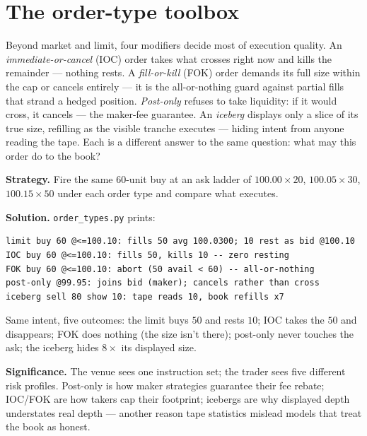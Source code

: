 \section{The order-type toolbox}\label{sec:ordertypes}
Beyond market and limit, four modifiers decide most of execution
quality. An \emph{immediate-or-cancel} (IOC) order takes what
crosses right now and kills the remainder --- nothing rests. A
\emph{fill-or-kill} (FOK) order demands its full size within the
cap or cancels entirely --- it is the all-or-nothing guard against
partial fills that strand a hedged position. \emph{Post-only}
refuses to take liquidity: if it would cross, it cancels ---
the maker-fee guarantee. An \emph{iceberg} displays only a slice
of its true size, refilling as the visible tranche executes ---
hiding intent from anyone reading the tape. Each is a different
answer to the same question: what may this order do to the book?

\begin{example}\label{ex:ordertypes}
\textbf{Strategy.} Fire the same 60-unit buy at an ask ladder of
$100.00\times20$, $100.05\times30$, $100.15\times50$ under each
order type and compare what executes.

\textbf{Solution.} \texttt{order\_types.py} prints:
\begin{verbatim}
limit buy 60 @<=100.10: fills 50 avg 100.0300; 10 rest as bid @100.10
IOC buy 60 @<=100.10: fills 50, kills 10 -- zero resting
FOK buy 60 @<=100.10: abort (50 avail < 60) -- all-or-nothing
post-only @99.95: joins bid (maker); cancels rather than cross
iceberg sell 80 show 10: tape reads 10, book refills x7
\end{verbatim}
Same intent, five outcomes: the limit buys $50$ and rests $10$;
IOC takes the $50$ and disappears; FOK does nothing (the size
isn't there); post-only never touches the ask; the iceberg hides
$8\times$ its displayed size.

\textbf{Significance.} The venue sees one instruction set; the
trader sees five different risk profiles. Post-only is how maker
strategies guarantee their fee rebate; IOC/FOK are how takers cap
their footprint; icebergs are why displayed depth understates real
depth --- another reason tape statistics mislead models that treat
the book as honest.
\end{example}


